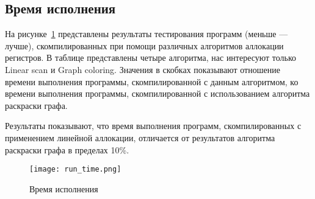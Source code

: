 \subsection{Время исполнения}

На рисунке~\ref{fig:run_time} представлены результаты тестирования программ (меньше --- лучше),
скомпилированных при помощи различных алгоритмов аллокации регистров.
В таблице представлены четыре алгоритма, нас интересуют только Linear scan и Graph coloring.
Значения в скобках показывают отношение времени выполнения программы,
скомпилированной с данным алгоритмом, ко времени выполнения программы,
скомпилированной с использованием алгоритма раскраски графа.

Результаты показывают, что время выполнения программ,
скомпилированных с применением линейной аллокации,
отличается от результатов алгоритма раскраски графа в пределах 10\%.

\begin{figure}[H]
	\texttt{[image: run\_time.png]}
	\caption{Время исполнения}
	\label{fig:run_time}
\end{figure}


